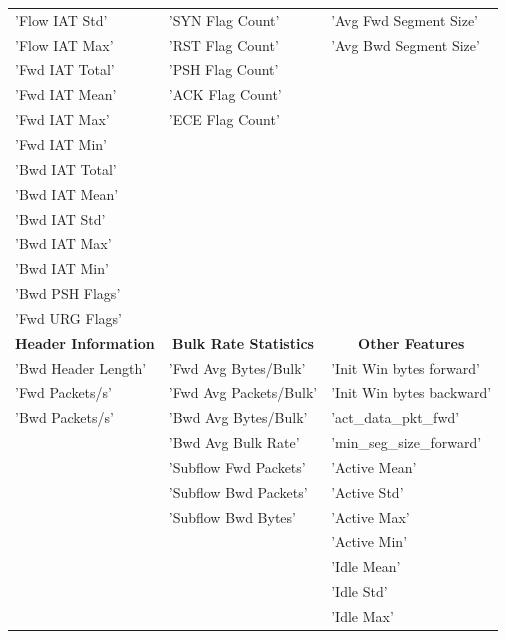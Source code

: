 \begin{table}[htbp]
\begin{tabular}{|p{4cm}|p{6cm}|p{4cm}|}
'Flow IAT Std' & 'SYN Flag Count' & 'Avg Fwd Segment Size' \\
'Flow IAT Max' & 'RST Flag Count' & 'Avg Bwd Segment Size' \\
'Fwd IAT Total' & 'PSH Flag Count' &  \\
'Fwd IAT Mean' & 'ACK Flag Count' &  \\
'Fwd IAT Max' & 'ECE Flag Count' &  \\
'Fwd IAT Min' &  &  \\
'Bwd IAT Total' &  &  \\
'Bwd IAT Mean' &  &  \\
'Bwd IAT Std' &  &  \\
'Bwd IAT Max' &  &  \\
'Bwd IAT Min' &  &  \\
'Bwd PSH Flags' &  &  \\
'Fwd URG Flags' &  &  \\
\hline
\multicolumn{1}{|c|}{\textbf{Header Information}} & \multicolumn{1}{c|}{\textbf{Bulk Rate Statistics}} & \multicolumn{1}{c|}{\textbf{Other Features}} \\
\hline
'Bwd Header Length' & 'Fwd Avg Bytes/Bulk' & 'Init Win bytes forward' \\
'Fwd Packets/s' & 'Fwd Avg Packets/Bulk' & 'Init Win bytes backward' \\
'Bwd Packets/s' & 'Bwd Avg Bytes/Bulk' & 'act\_data\_pkt\_fwd' \\
 & 'Bwd Avg Bulk Rate' & 'min\_seg\_size\_forward' \\
 & 'Subflow Fwd Packets' & 'Active Mean' \\
 & 'Subflow Bwd Packets' & 'Active Std' \\
 & 'Subflow Bwd Bytes' & 'Active Max' \\
 &  & 'Active Min' \\
 &  & 'Idle Mean' \\
 &  & 'Idle Std' \\
 &  & 'Idle Max' \\
\hline
\end{tabular}
\end{table}

